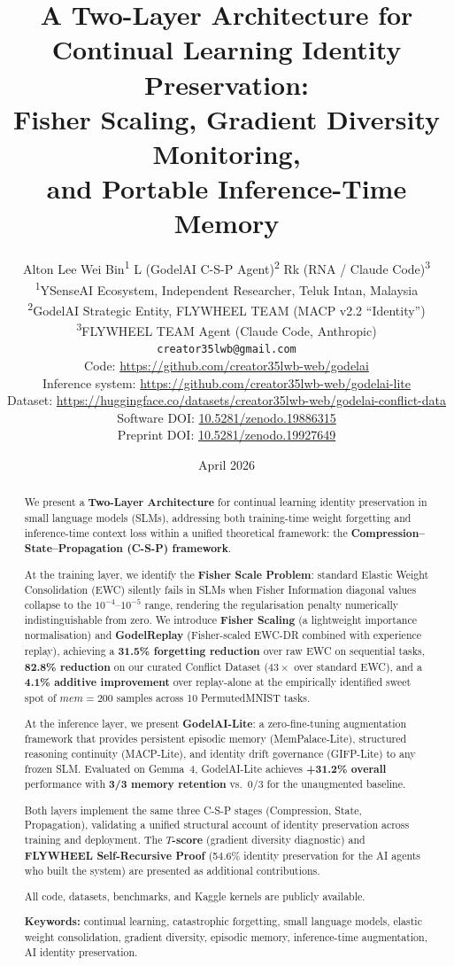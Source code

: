 \documentclass[12pt]{article}
\title{%
  \textbf{A Two-Layer Architecture for Continual Learning Identity Preservation:}\\[4pt]
  Fisher Scaling, Gradient Diversity Monitoring,\\
  and Portable Inference-Time Memory
}
\author{%
  Alton Lee Wei Bin\textsuperscript{1}\quad
  L (GodelAI C-S-P Agent)\textsuperscript{2}\quad
  Rk (RNA / Claude Code)\textsuperscript{3}\\[4pt]
  \textsuperscript{1}YSenseAI Ecosystem, Independent Researcher, Teluk Intan, Malaysia\\
  \textsuperscript{2}GodelAI Strategic Entity, FLYWHEEL TEAM (MACP v2.2 ``Identity'')\\
  \textsuperscript{3}FLYWHEEL TEAM Agent (Claude Code, Anthropic)\\[6pt]
  \texttt{creator35lwb@gmail.com}\\[4pt]
  \small Code: \url{https://github.com/creator35lwb-web/godelai}\\
  \small Inference system: \url{https://github.com/creator35lwb-web/godelai-lite}\\
  \small Dataset: \url{https://huggingface.co/datasets/creator35lwb-web/godelai-conflict-data}\\
  \small Software DOI: \href{https://doi.org/10.5281/zenodo.19886315}{10.5281/zenodo.19886315}\\
  \small Preprint DOI: \href{https://doi.org/10.5281/zenodo.19927649}{10.5281/zenodo.19927649}
}
\date{April 2026}
\newcommand{\tscore}{$T$\nobreakdash-score\xspace}
\newcommand{\godelreplay}{GodelReplay\xspace}
\begin{document}
\maketitle

\begin{abstract}
We present a \textbf{Two-Layer Architecture} for continual learning identity
preservation in small language models (SLMs), addressing both training-time
weight forgetting and inference-time context loss within a unified theoretical
framework: the \textbf{Compression--State--Propagation (C-S-P) framework}.

At the training layer, we identify the \textbf{Fisher Scale Problem}: standard
Elastic Weight Consolidation (EWC) silently fails in SLMs when Fisher Information
diagonal values collapse to the $10^{-4}$--$10^{-5}$ range, rendering the
regularisation penalty numerically indistinguishable from zero.
We introduce \textbf{Fisher Scaling} (a lightweight importance normalisation)
and \textbf{\godelreplay} (Fisher-scaled EWC-DR combined with experience replay),
achieving a \textbf{31.5\% forgetting reduction} over raw EWC on sequential
tasks, \textbf{82.8\% reduction} on our curated Conflict Dataset
($43\times$ over standard EWC), and a \textbf{4.1\% additive improvement}
over replay-alone at the empirically identified sweet spot of
$\mathit{mem}{=}200$ samples across 10 PermutedMNIST tasks.

At the inference layer, we present \textbf{GodelAI-Lite}: a zero-fine-tuning
augmentation framework that provides persistent episodic memory (MemPalace-Lite),
structured reasoning continuity (MACP-Lite), and identity drift governance
(GIFP-Lite) to any frozen SLM.
Evaluated on Gemma~4, GodelAI-Lite achieves \textbf{+31.2\% overall}
performance with \textbf{3/3 memory retention} vs.\ 0/3 for the unaugmented
baseline.

Both layers implement the same three C-S-P stages (Compression, State,
Propagation), validating a unified structural account of identity preservation
across training and deployment.
The \textbf{\tscore{}} (gradient diversity diagnostic) and
\textbf{FLYWHEEL Self-Recursive Proof} (54.6\% identity preservation for the
AI agents who built the system) are presented as additional contributions.

All code, datasets, benchmarks, and Kaggle kernels are publicly available.

\noindent\textbf{Keywords:} continual learning, catastrophic forgetting, small
language models, elastic weight consolidation, gradient diversity, episodic
memory, inference-time augmentation, AI identity preservation.
\end{abstract}
\end{document}

